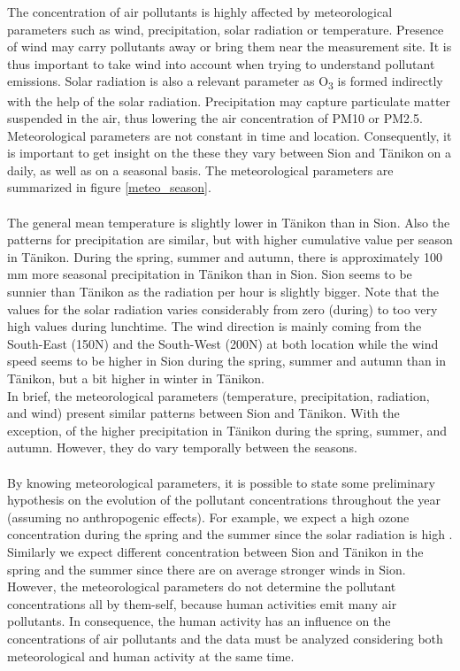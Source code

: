 \documentclass[a4paper, 12pt]{article}
\begin{document}
    The concentration of air pollutants is highly affected by meteorological parameters such as wind, precipitation, solar radiation or temperature. Presence of wind may carry pollutants away or bring them near the measurement site. It is thus important to take wind into account when trying to understand pollutant emissions. Solar radiation is also a relevant parameter as O\textsubscript{3} is formed indirectly with the help of the solar radiation. Precipitation may capture particulate matter suspended in the air, thus lowering the air concentration of PM10 or PM2.5. Meteorological parameters are not constant in time and location. Consequently, it is important to get insight on the these they vary between Sion and Tänikon on a daily, as well as on a seasonal basis.  The meteorological parameters are summarized in figure \ref{meteo_season}.
    \\
    \\
    The general mean temperature is slightly lower in Tänikon than in Sion. Also the patterns for precipitation are similar, but with higher cumulative value per season in Tänikon. During the spring, summer and autumn, there is approximately 100 mm more seasonal precipitation in Tänikon than in Sion. Sion seems to be sunnier than Tänikon as the radiation per hour is slightly bigger. Note that the values for the solar radiation varies considerably from zero (during) to too very high values during lunchtime. The wind direction is mainly coming from the South-East (150\degree N) and the South-West (200\degree N) at both location while the wind speed seems to be higher in Sion during the spring, summer and autumn than in Tänikon, but a bit higher in winter in Tänikon.
    \\
    In brief, the meteorological parameters (temperature, precipitation, radiation, and wind) present similar patterns between Sion and Tänikon. With the exception, of the higher precipitation in Tänikon during the spring, summer, and autumn. However, they do vary temporally between the seasons. 
    \\
    \\
    By knowing meteorological parameters, it is possible to state some preliminary hypothesis on the evolution of the pollutant concentrations throughout the year (assuming no anthropogenic effects). For example, we expect a high ozone concentration during the spring and the summer since the solar radiation is high . Similarly we expect different concentration between Sion and Tänikon in the spring and the summer since there are on average stronger winds in Sion. 
    \\
    However, the meteorological parameters do not determine the pollutant concentrations all by them-self, because human activities emit many air pollutants. In consequence, the human activity has an influence on the concentrations of air pollutants and the data must be analyzed considering both meteorological and human activity at the same time. 
\end{document}
